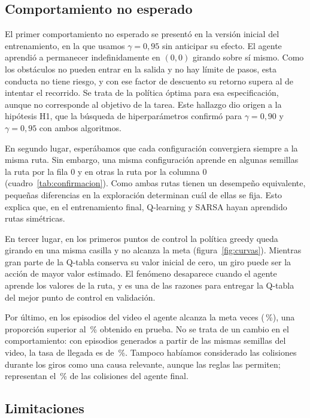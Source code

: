 \documentclass[11pt,letterpaper]{article}
\begin{document}
\subsection{Comportamiento no esperado}

El primer comportamiento no esperado se presentó en la versión inicial del entrenamiento, en la que usamos
$\gamma=0{,}95$ sin anticipar su efecto. El agente aprendió a permanecer indefinidamente en $(0,0)$ girando sobre
sí mismo. Como los obstáculos no pueden entrar en la salida y no hay límite de pasos, esta conducta no tiene
riesgo, y con ese factor de descuento su retorno supera al de intentar el recorrido. Se trata de la política
óptima para esa especificación, aunque no corresponde al objetivo de la tarea. Este hallazgo dio origen a la
hipótesis H1, que la búsqueda de hiperparámetros confirmó para $\gamma=0{,}90$ y $\gamma=0{,}95$ con ambos
algoritmos.

En segundo lugar, esperábamos que cada configuración convergiera siempre a la misma ruta. Sin embargo, una misma
configuración aprende en algunas semillas la ruta por la fila 0 y en otras la ruta por la columna 0
(cuadro~\ref{tab:confirmacion}). Como ambas rutas tienen un desempeño equivalente, pequeñas diferencias en la
exploración determinan cuál de ellas se fija. Esto explica que, en el entrenamiento final, Q-learning y SARSA
hayan aprendido rutas simétricas.

En tercer lugar, en los primeros puntos de control la política greedy queda girando en una misma casilla y no
alcanza la meta (figura~\ref{fig:curvas}). Mientras gran parte de la Q-tabla conserva su valor inicial de cero,
un giro puede ser la acción de mayor valor estimado. El fenómeno desaparece cuando el agente aprende los valores
de la ruta, y es una de las razones para entregar la Q-tabla del mejor punto de control en validación.

Por último, en los \VideoEpisodios{} episodios del video el agente alcanza la meta \VideoMeta{} veces
(\VideoExito\,\%), una proporción superior al \QLExito\,\% obtenido en prueba. No se trata de un cambio en el
comportamiento: con \TurnosPrueba{} episodios generados a partir de las mismas semillas del video, la tasa de
llegada es de \VideoExitoLargo\,\%. Tampoco habíamos considerado las colisiones durante los giros como una causa
relevante, aunque las reglas las permiten; representan el \CausaGirando\,\% de las colisiones del agente final.

\subsection{Limitaciones}
\end{document}
